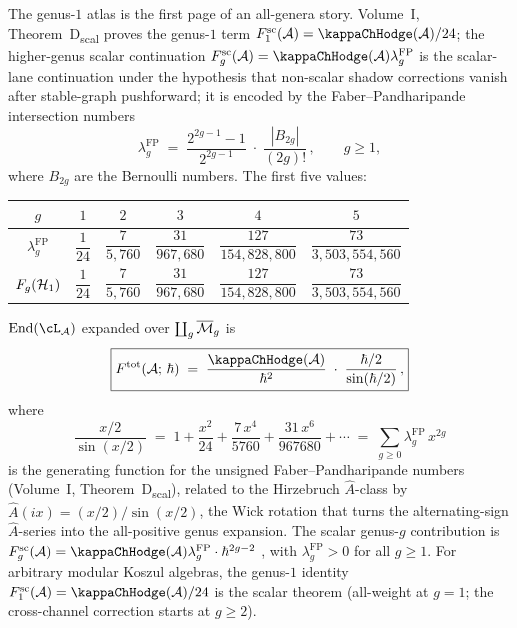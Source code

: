 The genus-$1$ atlas is the first page of an
all-genera story. Volume~I, Theorem~D\textsubscript{scal}
proves the genus-$1$ term
$F_1^{\mathrm{sc}}(\cA)=\kappaChHodge(\cA)/24$; the higher-genus
scalar continuation
$F_g^{\mathrm{sc}}(\cA)=\kappaChHodge(\cA)\lambda_g^{\mathrm{FP}}$
is the scalar-lane continuation under the hypothesis that
non-scalar shadow corrections vanish after stable-graph pushforward;
it is encoded by the
Faber--Pandharipande intersection
numbers
\begin{equation}\label{eq:faber-pandharipande}
\lambda_g^{\mathrm{FP}}
\;=\;
\frac{2^{2g-1} - 1}{2^{2g-1}}
\;\cdot\;
\frac{|B_{2g}|}{(2g)!}\,,
\qquad g \ge 1,
\end{equation}
where $B_{2g}$ are the Bernoulli numbers. The
first five values:
\begin{center}
\small
\renewcommand{\arraystretch}{1.2}
\begin{tabular}{cccccc}
\toprule
$g$ & $1$ & $2$ & $3$ & $4$ & $5$ \\
\midrule
$\lambda_g^{\mathrm{FP}}$ &
 $\dfrac{1}{24}$ &
 $\dfrac{7}{5{,}760}$ &
 $\dfrac{31}{967{,}680}$ &
 $\dfrac{127}{154{,}828{,}800}$ &
 $\dfrac{73}{3{,}503{,}554{,}560}$ \\[6pt]
$F_g(\mathcal{H}_1)$ &
 $\dfrac{1}{24}$ &
 $\dfrac{7}{5{,}760}$ &
 $\dfrac{31}{967{,}680}$ &
 $\dfrac{127}{154{,}828{,}800}$ &
 $\dfrac{73}{3{,}503{,}554{,}560}$ \\
\bottomrule
\end{tabular}
\end{center}

\begin{theorem}%
\label{thm:ahat-lagrangian}%
$\End(\cL_\cA)$ expanded over $\coprod_g \overline{\mathcal{M}}_g$ is
\begin{equation}\label{eq:total-free-energy}
\boxed{
F^{\mathrm{tot}}(\cA;\, \hbar)
\;=\;
\frac{\kappaChHodge(\cA)}{\hbar^2}
\;\cdot\;
\frac{\hbar/2}{\sin(\hbar/2)}\,,
}
\end{equation}
where
\begin{equation}\label{eq:ahat-series}
\frac{x/2}{\sin(x/2)}
\;=\;
1 + \frac{x^2}{24} + \frac{7\, x^4}{5760}
 + \frac{31\, x^6}{967680} + \cdots
\;=\;
\sum_{g \ge 0}
 \lambda_g^{\mathrm{FP}}\, x^{2g}
\end{equation}
is the generating function for the unsigned
Faber--Pandharipande numbers
\textup{(}Volume~I,
Theorem~D\textsubscript{scal}\textup{)},
related to the Hirzebruch $\hat{A}$-class by
$\hat{A}(ix) = (x/2)/\sin(x/2)$, the Wick rotation
that turns the alternating-sign $\hat{A}$-series into
the all-positive genus expansion.
The scalar genus-$g$ contribution is
$F_g^{\mathrm{sc}}(\cA)=\kappaChHodge(\cA)\lambda_g^{\mathrm{FP}} \cdot
\hbar^{2g-2}$ ,
with $\lambda_g^{\mathrm{FP}} > 0$
for all $g \ge 1$. For arbitrary modular Koszul algebras, the
genus-$1$ identity
$F_1^{\mathrm{sc}}(\cA)=\kappaChHodge(\cA)/24$ is the scalar theorem
(all-weight at $g = 1$; the
cross-channel correction starts at $g \ge 2$).
\end{theorem}

